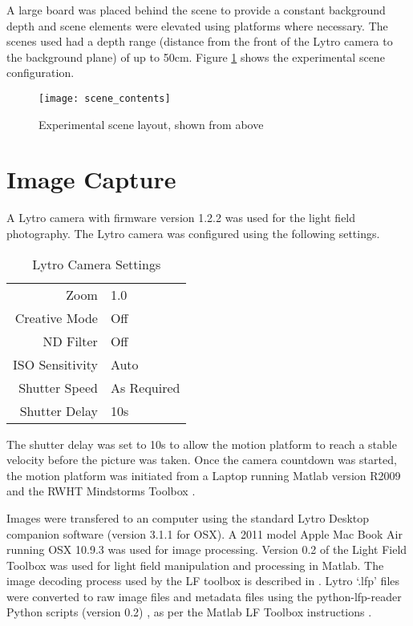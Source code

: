 A large board was placed behind the scene to provide a constant background depth and scene elements were elevated using platforms where necessary.
The scenes used had a depth range (distance from the front of the Lytro camera to the background plane) of up to 50cm.
Figure \ref{fig:scene_description} shows the experimental scene configuration.

\begin{figure}[h]
\centering
\texttt{[image: scene\_contents]}
\caption[Experimental scene layout]{Experimental scene layout, shown from above}
\label{fig:scene_description}
\end{figure}


\section{Image Capture}
\label{sec:image_capture}

A Lytro camera with firmware version 1.2.2 was used for the light field photography.
The Lytro camera was configured using the following settings.

\begin{table}[h]
\centering
\caption{Lytro Camera Settings}
\label{tab:lytro_settings}
\begin{tabular}{r | l}
Zoom & 1.0 \\
Creative Mode & Off \\
ND Filter & Off \\
ISO Sensitivity & Auto \\
Shutter Speed & As Required \\
Shutter Delay & 10s \\
\end{tabular}
\end{table}

The shutter delay was set to 10s to allow the motion platform to reach a stable velocity before the picture was taken.
Once the camera countdown was started, the motion platform was initiated from a Laptop running Matlab version R2009 and the RWHT Mindstorms Toolbox \cite{rwth2007toolbox}.

Images were transfered to an computer using the standard Lytro Desktop companion software (version 3.1.1 for OSX).
A 2011 model Apple Mac Book Air running OSX 10.9.3 was used for image processing.
Version 0.2 of the Light Field Toolbox \cite{dansereau2013toolbox} was used for light field manipulation and processing in Matlab.
The image decoding process used by the LF toolbox is described in \cite{dansereau2013decoding}.
Lytro \enquote*{.lfp} files were converted to raw image files and metadata files using the python-lfp-reader Python scripts (version 0.2) \cite{esfahbod2013python}, as per the Matlab LF Toolbox instructions \cite{dansereau2013toolbox}.

